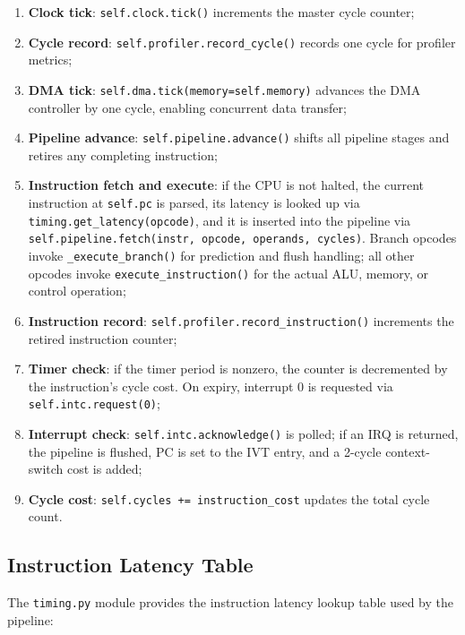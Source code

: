\documentclass[10pt,a4paper,twoside]{book}
\begin{document}
\begin{enumerate}
    \item \textbf{Clock tick}: \texttt{self.clock.tick()} increments the
          master cycle counter;
    \item \textbf{Cycle record}: \texttt{self.profiler.record\_cycle()}
          records one cycle for profiler metrics;
    \item \textbf{DMA tick}: \texttt{self.dma.tick(memory=self.memory)}
          advances the DMA controller by one cycle, enabling concurrent
          data transfer;
    \item \textbf{Pipeline advance}: \texttt{self.pipeline.advance()}
          shifts all pipeline stages and retires any completing instruction;
    \item \textbf{Instruction fetch and execute}: if the CPU is not halted,
          the current instruction at \texttt{self.pc} is parsed, its latency
          is looked up via \texttt{timing.get\_latency(opcode)}, and it is
          inserted into the pipeline via
          \texttt{self.pipeline.fetch(instr, opcode, operands, cycles)}.
          Branch opcodes invoke \texttt{\_execute\_branch()} for prediction
          and flush handling; all other opcodes invoke
          \texttt{execute\_instruction()} for the actual ALU, memory, or
          control operation;
    \item \textbf{Instruction record}: \texttt{self.profiler.record\_instruction()}
          increments the retired instruction counter;
    \item \textbf{Timer check}: if the timer period is nonzero, the counter
          is decremented by the instruction's cycle cost. On expiry,
          interrupt 0 is requested via \texttt{self.intc.request(0)};
    \item \textbf{Interrupt check}: \texttt{self.intc.acknowledge()} is
          polled; if an IRQ is returned, the pipeline is flushed, PC is
          set to the IVT entry, and a 2-cycle context-switch cost is added;
    \item \textbf{Cycle cost}: \texttt{self.cycles += instruction\_cost}
          updates the total cycle count.
\end{enumerate}

\subsection{Instruction Latency Table}

The \texttt{timing.py} module provides the instruction latency lookup table
used by the pipeline:
\end{document}
